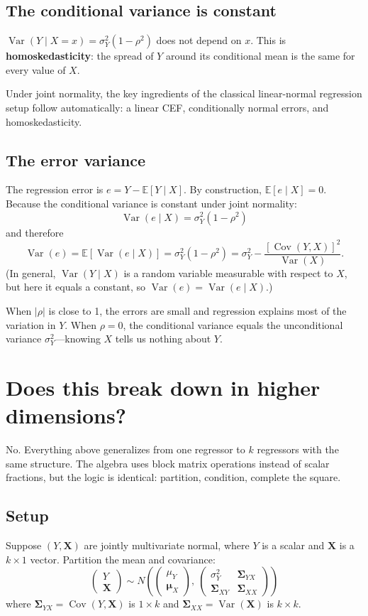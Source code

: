 \documentclass[11pt]{article}
\newcommand{\Var}{\operatorname{Var}}
\newcommand{\Cov}{\operatorname{Cov}}
\begin{document}
\subsection{The conditional variance is constant}

$\Var(Y\mid X=x) = \sigma_Y^2(1-\rho^2)$ does not depend on $x$.  This is \textbf{homoskedasticity}: the spread of $Y$ around its conditional mean is the same for every value of $X$.

\medskip\noindent
Under joint normality, the key ingredients of the classical linear-normal regression setup follow automatically: a linear CEF, conditionally normal errors, and homoskedasticity.

\subsection{The error variance}

The regression error is $e = Y - \mathbb{E}[Y\mid X]$.  By construction, $\mathbb{E}[e\mid X]=0$.  Because the conditional variance is constant under joint normality:
\[
\Var(e\mid X) = \sigma_Y^2(1-\rho^2)
\]
and therefore
\[
\Var(e) = \mathbb{E}[\Var(e\mid X)] = \sigma_Y^2(1-\rho^2) = \sigma_Y^2 - \frac{[\Cov(Y,X)]^2}{\Var(X)}.
\]
(In general, $\Var(Y\mid X)$ is a random variable measurable with respect to $X$, but here it equals a constant, so $\Var(e)=\Var(e\mid X)$.)

\medskip\noindent
When $|\rho|$ is close to 1, the errors are small and regression explains most of the variation in $Y$.  When $\rho = 0$, the conditional variance equals the unconditional variance $\sigma_Y^2$---knowing $X$ tells us nothing about $Y$.

\section{Does this break down in higher dimensions?}

No.  Everything above generalizes from one regressor to $k$ regressors with the same structure.  The algebra uses block matrix operations instead of scalar fractions, but the logic is identical: partition, condition, complete the square.

\subsection{Setup}

Suppose $(Y, \bm{X})$ are jointly multivariate normal, where $Y$ is a scalar and $\bm{X}$ is a $k\times 1$ vector.  Partition the mean and covariance:
\[
\begin{pmatrix} Y \\ \bm{X} \end{pmatrix}
\sim N\!\left(
\begin{pmatrix} \mu_Y \\ \bm{\mu}_X \end{pmatrix},\
\begin{pmatrix} \sigma_Y^2 & \bm{\Sigma}_{YX} \\ \bm{\Sigma}_{XY} & \bm{\Sigma}_{XX} \end{pmatrix}
\right)
\]
where $\bm{\Sigma}_{YX} = \Cov(Y, \bm{X})$ is $1\times k$ and $\bm{\Sigma}_{XX} = \Var(\bm{X})$ is $k\times k$.
\end{document}
